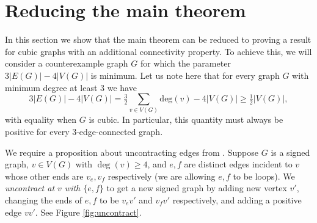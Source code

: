 \documentclass[12pt]{article}
\newcommand{\Z}{\mathbb{Z}}
\begin{document}



\section{Reducing the main theorem}\label{3ecs1}



In this section we show that the main theorem can be reduced to proving a result for cubic graphs with an additional connectivity property.  To achieve this, we will consider a counterexample graph $G$ for which the parameter $3|E(G)| - 4|V(G)|$ is minimum.  Let us note here that for every graph $G$ with minimum degree at least 3 we have 
\[ 3|E(G)| - 4 |V(G)| = \tfrac{3}{2} \sum_{v \in V(G)} \mathrm{deg}(v) - 4 |V(G)| \ge \tfrac{1}{2}|V(G)|, \]
with equality when $G$ is cubic.  In particular, this quantity must always be positive for every 3-edge-connected graph.  



\medskip

We require a proposition about uncontracting edges from \cite{doi:10.1137/23M1615218}.
Suppose $G$ is a signed graph, $v \in V(G)$ with $\deg(v) \geq 4$, and $e,f$ are distinct edges incident to $v$ whose other ends are $v_e, v_f$ respectively (we are allowing $e,f$ to be loops). We \emph{uncontract at $v$ with $\{e,f\}$} to get a new signed graph by adding new vertex $v'$, changing the ends of $e,f$ to be $v_ev'$ and $v_fv'$ respectively, and adding a positive edge $vv'$. See Figure \ref{fig:uncontract}. 
\end{document}
